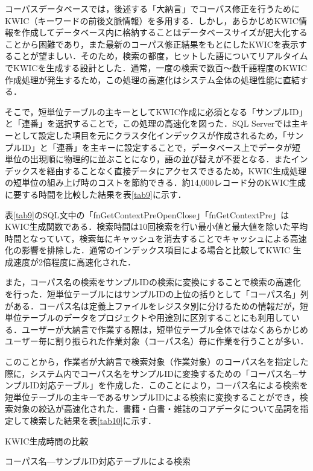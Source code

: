 \documentclass[japanese]{jnlp_1.4}
\begin{document}
コーパスデータベースでは，後述する「大納言」でコーパス修正を行うためにKWIC（キーワードの前後文脈情報）を多用する．しかし，あらかじめKWIC情報を作成してデータベース内に格納することはデータベースサイズが肥大化することから困難であり，また最新のコーパス修正結果をもとにしたKWICを表示することが望ましい．そのため，検索の都度，ヒットした語についてリアルタイムでKWICを生成する設計とした．通常，一度の検索で数百〜数千語程度のKWIC作成処理が発生するため，この処理の高速化はシステム全体の処理性能に直結する．

そこで，短単位テーブルの主キーとしてKWIC作成に必須となる「サンプルID」と「連番」を選択することで，この処理の高速化を図った．SQL Serverでは主キーとして設定した項目を元にクラスタ化インデックスが作成されるため，「サンプルID」と「連番」を主キーに設定することで，データベース上でデータが短単位の出現順に物理的に並ぶことになり，語の並び替えが不要となる．またインデックスを経由することなく直接データにアクセスできるため，KWIC生成処理の短単位の組み上げ時のコストを節約できる．約14,000レコード分のKWIC生成に要する時間を比較した結果を表\ref{tab9}に示す．

表\ref{tab9}のSQL文中の「fnGetContextPreOpenClose」「fnGetContextPre」はKWIC生成関数である．検索時間は10回検索を行い最小値と最大値を除いた平均時間となっていて，検索毎にキャッシュを消去することでキャッシュによる高速化の影響を排除した．通常のインデックス項目による場合と比較してKWIC 生成速度が2倍程度に高速化された．

また，コーパス名の検索をサンプルIDの検索に変換にすることで検索の高速化を行った．短単位テーブルにはサンプルIDの上位の括りとして「コーパス名」列がある．コーパス名は定義上ファイルをレジスタ別に分けるための情報だが，短単位テーブルのデータをプロジェクトや用途別に区別することにも利用している．ユーザーが大納言で作業する際は，短単位テーブル全体ではなくあらかじめユーザー毎に割り振られた作業対象（コーパス名）毎に作業を行うことが多い．

このことから，作業者が大納言で検索対象（作業対象）のコーパス名を指定した際に，システム内でコーパス名をサンプルIDに変換するための「コーパス名−サンプルID対応テーブル」を作成した．このことにより，コーパス名による検索を短単位テーブルの主キーであるサンプルIDによる検索に変換することができ，検索対象の絞込が高速化された．書籍・白書・雑誌のコアデータについて品詞を指定して検索した結果を表\ref{tab10}に示す．

\begin{table}[b]
\caption{KWIC生成時間の比較}

\label{tab9}
\end{table}
\begin{table}[b]
\caption{コーパス名—サンプルID対応テーブルによる検索}

\label{tab10}
\end{table}
\end{document}
